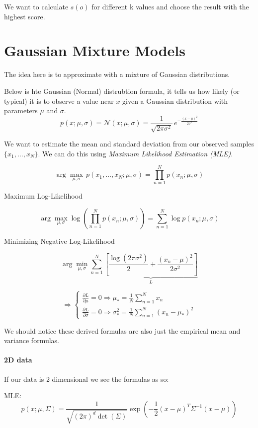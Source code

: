 \documentclass[11pt]{article}
\begin{document}
We want to calculate $s(o)$ for different k values and choose the result with the highest score.

\pagebreak

\section*{Gaussian Mixture Models}
The idea here is to approximate with a mixture of Gaussian distributions.

Below is hte Gaussian (Normal) distrubtion formula, it tells us how likely (or typical) it is to observe a value near
$x$ given a Gaussian distribution with parameters $\mu$ and $\sigma$.
\[
	p(x; \mu, \sigma) = \mathcal{N}(x; \mu, \sigma) = \frac{1}{\sqrt{2\pi\sigma^2}} \, e^{ -\frac{(x - \mu)^2}{2\sigma^2} }
\]

We want to estimate the mean and standard deviation
from our observed samples $\{x_1, \dots, x_N\}$. We can do this using \textit{Maximum Likelihood Estimation (MLE)}.


\[
	\arg\max_{\mu, \sigma} \, p(x_1, \dots, x_N; \mu, \sigma) = \prod_{n=1}^{N} p(x_n; \mu, \sigma)
\]

Maximum Log-Likelihood

\[
	\arg\max_{\mu, \sigma} \log \left( \prod_{n=1}^{N} p(x_n; \mu, \sigma) \right) = \sum_{n=1}^{N} \log p(x_n; \mu, \sigma)
\]

Minimizing Negative Log-Likelihood

\[
	\arg\min_{\mu, \sigma} \sum_{n=1}^{N}
	\underbrace{
		\left[
			\frac{ \log(2\pi\sigma^2) }{2} + \frac{(x_n - \mu)^2}{2\sigma^2}
			\right]
	}_{L}
\]

\[
	\Rightarrow
	\begin{cases}
		\frac{\partial L}{\partial \mu} = 0 \Rightarrow \mu_* = \frac{1}{N} \sum_{n=1}^{N} x_n \\[1em]
		\frac{\partial L}{\partial \sigma} = 0 \Rightarrow \sigma^2_* = \frac{1}{N} \sum_{n=1}^{N} (x_n - \mu_*)^2
	\end{cases}
\]

We should notice these derived formulas are also just the empirical mean and variance formulas.

\paragraph*{2D data}
If our data is 2 dimensional we see the formulas as so:

\medskip

MLE:
\[
	p(x; \mu, \Sigma) = \frac{1}{\sqrt{(2\pi)^d \det(\Sigma)}}
	\exp\left( -\frac{1}{2} (x - \mu)^T \Sigma^{-1} (x - \mu) \right)
\]
\end{document}
